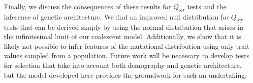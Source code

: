 Finally, we discuss the consequences of these results for $Q_{ST}$ tests and the
inference of genetic architecture. We find an improved null distribution for
$Q_{ST}$ tests that can be derived simply by using the normal distribution that
arises in the infinitesimal limit of our coalescent model. Additionally, we show
that it is likely not possible to infer features of the mutational distribution
using only trait values sampled from a population. Future work will be necessary
to develop tests for selection that take into account both demography and
genetic architecture, but the model developed here provides the groundwork for
such an undertaking. 

